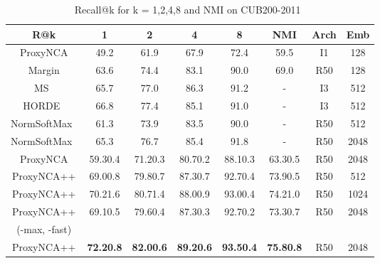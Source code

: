\documentclass[runningheads]{llncs}
\begin{document}
\begin{table}[htb]
\centering
\caption{Recall@k for k = 1,2,4,8 and NMI on CUB200-2011~\cite{wah2011caltech}}
\setlength{\tabcolsep}{2pt}
\begin{tabular}{|*8c|}
\hline
R@k & 1 & 2 & 4 & 8 & NMI & Arch & Emb\\ \hline
\small{ProxyNCA\cite{movshovitz2017no}} & 49.2 & 61.9 & 67.9 & 72.4 & 59.5& \small{I1} & \small{128}\\
\small{Margin\cite{wu2017sampling}} & 63.6 & 74.4 & 83.1 & 90.0 & 69.0 & \small{R50}& \small{128}\\
\small{MS~\cite{wang2019multi}}& 65.7 & 77.0 & 86.3 & 91.2 & - & \small{I3}& \small{512}\\
\small{HORDE~\cite{jacob2019metric}}& 66.8 & 77.4 & 85.1 & 91.0 & - & \small{I3}& \small{512}\\
\small{NormSoftMax~\cite{zhai2019}}& 61.3 & 73.9 & 83.5 & 90.0 & - & \small{R50}& \small{512}\\
\small{NormSoftMax~\cite{zhai2019}}& 65.3 & 76.7 & 85.4 & 91.8 & - & \small{R50}& \small{2048}\\
\hline
\small{ProxyNCA} & 59.30.4 & 71.20.3 & 80.70.2 & 88.10.3 & 63.30.5 & \small{R50}& \small{2048}\\
\small{ProxyNCA++} & 69.00.8 & 79.80.7 & 87.30.7 & 92.70.4 & 73.90.5 & \small{R50}& \small{512}\\
\small{ProxyNCA++} & 70.21.6 & 80.71.4 & 88.00.9 & 93.00.4 & 74.21.0 & \small{R50}& \small{1024}\\
\small{ProxyNCA++} & 69.10.5 & 79.60.4 & 87.30.3 & 92.70.2 & 73.30.7 & \small{R50}& \small{2048}\\
\small{(-max, -fast)}& & & & & & &\\
\small{ProxyNCA++} & \textbf{72.20.8} & \textbf{82.00.6} & \textbf{89.20.6} & \textbf{93.50.4} & \textbf{75.80.8} & \small{R50}& \small{2048}\\
\hline
\end{tabular}
\label{table:cub}
\end{table}
\end{document}
